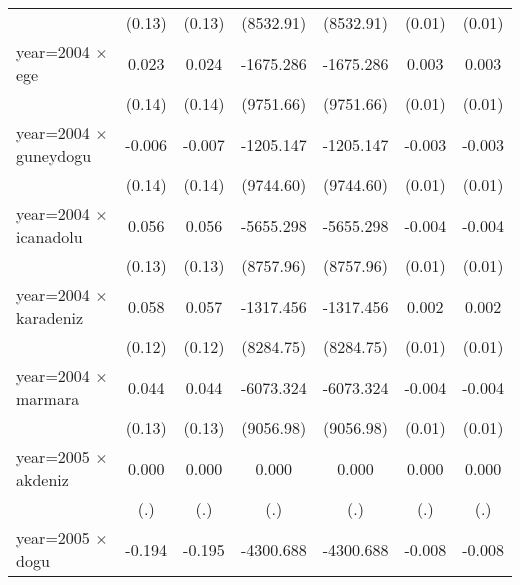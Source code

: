 {\begin{tabular}{l*{6}{c}}
                    &      (0.13)         &      (0.13)         &   (8532.91)         &   (8532.91)         &      (0.01)         &      (0.01)         \\
year=2004 $\times$ ege&       0.023         &       0.024         &   -1675.286         &   -1675.286         &       0.003         &       0.003         \\
                    &      (0.14)         &      (0.14)         &   (9751.66)         &   (9751.66)         &      (0.01)         &      (0.01)         \\
year=2004 $\times$ guneydogu&      -0.006         &      -0.007         &   -1205.147         &   -1205.147         &      -0.003         &      -0.003         \\
                    &      (0.14)         &      (0.14)         &   (9744.60)         &   (9744.60)         &      (0.01)         &      (0.01)         \\
year=2004 $\times$ icanadolu&       0.056         &       0.056         &   -5655.298         &   -5655.298         &      -0.004         &      -0.004         \\
                    &      (0.13)         &      (0.13)         &   (8757.96)         &   (8757.96)         &      (0.01)         &      (0.01)         \\
year=2004 $\times$ karadeniz&       0.058         &       0.057         &   -1317.456         &   -1317.456         &       0.002         &       0.002         \\
                    &      (0.12)         &      (0.12)         &   (8284.75)         &   (8284.75)         &      (0.01)         &      (0.01)         \\
year=2004 $\times$ marmara&       0.044         &       0.044         &   -6073.324         &   -6073.324         &      -0.004         &      -0.004         \\
                    &      (0.13)         &      (0.13)         &   (9056.98)         &   (9056.98)         &      (0.01)         &      (0.01)         \\
year=2005 $\times$ akdeniz&       0.000         &       0.000         &       0.000         &       0.000         &       0.000         &       0.000         \\
                    &         (.)         &         (.)         &         (.)         &         (.)         &         (.)         &         (.)         \\
year=2005 $\times$ dogu&      -0.194         &      -0.195         &   -4300.688         &   -4300.688         &      -0.008         &      -0.008         \\

\end{tabular}}
